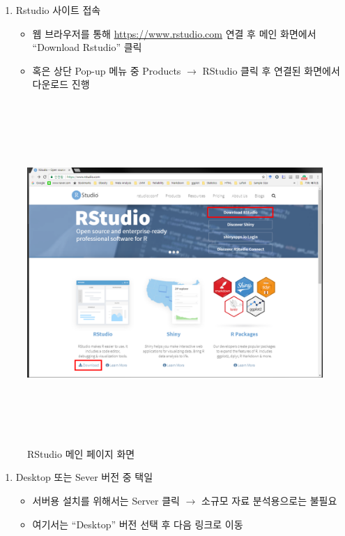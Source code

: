 \documentclass[11pt,a4paper]{book}
\providecommand{\tightlist}{%
  \setlength{\itemsep}{0pt}\setlength{\parskip}{0pt}}
\theoremstyle{definition}
\theoremstyle{definition}
\theoremstyle{definition}
\theoremstyle{remark}
\begin{document}
\begin{enumerate}
\def\labelenumi{\arabic{enumi}.}
\tightlist
\item
  Rstudio 사이트 접속

  \begin{itemize}
  \tightlist
  \item
    웹 브라우저를 통해 \url{https://www.rstudio.com} 연결 후 메인
    화면에서 ``Download Rstudio'' 클릭
  \item
    혹은 상단 Pop-up 메뉴 중 Products \(\rightarrow\) RStudio 클릭 후
    연결된 화면에서 다운로드 진행
  \end{itemize}
\end{enumerate}

\begin{figure}[H]
{
  \centering
  \includegraphics[width = 13cm, height = 13cm]{Figures/Rstudio-main.png}
  \caption[RStudio 메인 페이지]{RStudio 메인 페이지 화면}\label{fig:Rstudio-install-01}
}
\end{figure}

\begin{enumerate}
\def\labelenumi{\arabic{enumi}.}
\setcounter{enumi}{1}
\tightlist
\item
  Desktop 또는 Sever 버전 중 택일

  \begin{itemize}
  \tightlist
  \item
    서버용 설치를 위해서는 Server 클릭 \(\rightarrow\) 소규모 자료
    분석용으로는 불필요
  \item
    여기서는 ``Desktop'' 버전 선택 후 다음 링크로 이동
  \end{itemize}
\end{enumerate}
\end{document}
